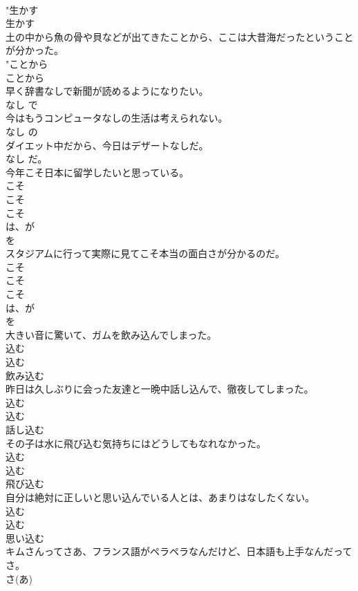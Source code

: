 \documentclass[8pt]{extreport}
\begin{document}
\begin{CJK}{UTF8}{min}
{{\\	"生かす 
\\	生かす 
\\	土の中から魚の骨や貝などが出てきたことから、ここは大昔海だったということが分かった。	
\\	"ことから 
\\	ことから 
\\	早く辞書なしで新聞が読めるようになりたい。	
\\	なし で　
\\	今はもうコンピュータなしの生活は考えられない。	
\\	なし の　
\\	ダイエット中だから、今日はデザートなしだ。	
\\	なし だ。 
\\	今年こそ日本に留学したいと思っている。	
\\	こそ 
\\	こそ 
\\	こそ 
\\	は、が 
\\	を 
\\	スタジアムに行って実際に見てこそ本当の面白さが分かるのだ。	
\\	こそ 
\\	こそ 
\\	こそ 
\\	は、が 
\\	を 
\\	大きい音に驚いて、ガムを飲み込んでしまった。	
\\	込む 
\\	込む 
\\	{飲み込む}
\\	昨日は久しぶりに会った友達と一晩中話し込んで、徹夜してしまった。	
\\	込む 
\\	込む 
\\	{話し込む}
\\	その子は水に飛び込む気持ちにはどうしてもなれなかった。	
\\	込む 
\\	込む 
\\	{飛び込む}
\\	自分は絶対に正しいと思い込んでいる人とは、あまりはなしたくない。	
\\	込む 
\\	込む 
\\	{思い込む}
\\	キムさんってさあ、フランス語がペラペラなんだけど、日本語も上手なんだってさ。	
\\	さ(あ) 
}}
\end{CJK}
\end{document}
